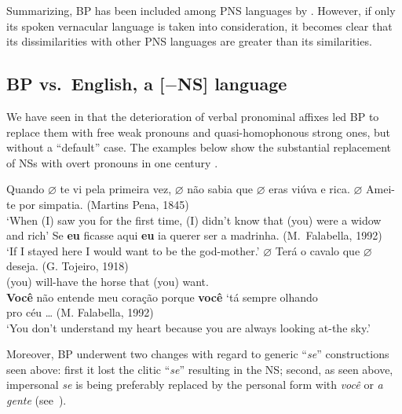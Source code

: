 \documentclass[output=paper]{langsci/langscibook}
\begin{document}
Summarizing, \gls{BP} has been included among
\gls{PNS} languages by \citet{HolShee2010}. However, if only its spoken
vernacular language is taken into consideration, it becomes clear that its
dissimilarities with other \gls{PNS} languages are greater than  its
similarities.

\subsection{BP vs.\ English, a [$-$NS] language}\label{sec:26.3.4}

We have seen in  that the deterioration of verbal pronominal
affixes led \gls{BP} to replace them with free weak
pronouns and quasi-homophonous strong ones, but without a “default”
case. The examples below show the substantial replacement of NSs with overt
pronouns in one century \parencite{Duarte1993,Duarte2012}.

\ea%
    \label{ex:26.42}
    \ea     Quando \textbf{$\varnothing$\tss{\Fsg}} te vi pela
    primeira vez, \textbf{$\varnothing$\tss{\Fsg}} não sabia que
    \textbf{$\varnothing$\tss{\Ssg}} eras viúva e rica.
    \textbf{$\varnothing$\tss{\Fsg}} Amei-te por simpatia.  (Martins
    Pena, 1845)\\ ‘When (I) saw you for the first time, (I) didn’t know that
    (you) were a widow and rich’
    \ex     Se \textbf{eu} ficasse aqui \textbf{eu} ia querer ser a madrinha.
    (M.\ Falabella, 1992)\\ ‘If  I   stayed here  I would want to be the
    god-mother.’
    \z
\ex%
    \label{ex:26.43}
    \ea
	\gll	\textbf{$\varnothing$\tss{\Ssg}} Terá o cavalo que \textbf{$\varnothing$\tss{\Ssg}} deseja. (G. Tojeiro, 1918)\\
			(you) will-have the horse that (you) want.\\
	\ex	    \textbf{Você} não entende meu coração porque \textbf{você} ‘tá sempre olhando\\
			pro céu \dots{} (M. Falabella, 1992) \\
	        \enquote*{You don't understand my heart because  you are always looking at-the sky.}
    \z
\z

Moreover, \gls{BP} underwent two changes with regard
to generic “\emph{se}” constructions seen above:  first it lost the clitic
“\emph{se}” resulting in the NS; second, as seen above, impersonal
\emph{se} is being preferably replaced by the personal form with
\emph{você} or \emph{a gente} (see~).
\end{document}
